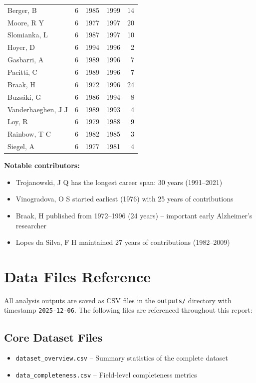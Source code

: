 \documentclass{../latex/analysis_report}
\begin{document}
\begin{longtable}{lrrrr}
Berger, B & 6 & 1985 & 1999 & 14 \\
Moore, R Y & 6 & 1977 & 1997 & 20 \\
Slomianka, L & 6 & 1987 & 1997 & 10 \\
Hoyer, D & 6 & 1994 & 1996 & 2 \\
Gasbarri, A & 6 & 1989 & 1996 & 7 \\
Pacitti, C & 6 & 1989 & 1996 & 7 \\
Braak, H & 6 & 1972 & 1996 & 24 \\
Buzsáki, G & 6 & 1986 & 1994 & 8 \\
Vanderhaeghen, J J & 6 & 1989 & 1993 & 4 \\
Loy, R & 6 & 1979 & 1988 & 9 \\
Rainbow, T C & 6 & 1982 & 1985 & 3 \\
Siegel, A & 6 & 1977 & 1981 & 4 \\

\end{longtable}

\textbf{Notable contributors:}
\begin{itemize}[noitemsep]
    \item Trojanowski, J Q has the longest career span: 30 years (1991--2021)
    \item Vinogradova, O S started earliest (1976) with 25 years of contributions
    \item Braak, H published from 1972--1996 (24 years) -- important early Alzheimer's researcher
    \item Lopes da Silva, F H maintained 27 years of contributions (1982--2009)
\end{itemize}

\clearpage
\section{Data Files Reference}
\label{app:datafiles}

All analysis outputs are saved as CSV files in the \texttt{outputs/} directory with timestamp \texttt{2025-12-06}. The following files are referenced throughout this report:

\subsection{Core Dataset Files}
\begin{itemize}[noitemsep]
    \item \texttt{dataset\_overview.csv} -- Summary statistics of the complete dataset
    \item \texttt{data\_completeness.csv} -- Field-level completeness metrics
\end{itemize}
\end{document}
